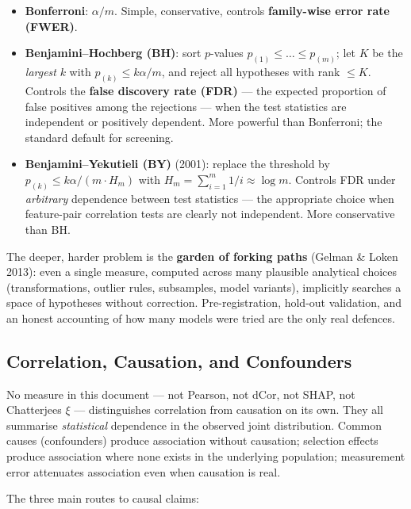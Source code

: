 \documentclass{article}
\providecommand{\tightlist}{\setlength{\itemsep}{0pt}\setlength{\parskip}{0pt}}
\begin{document}
\begin{itemize}
\tightlist
\item
  \textbf{Bonferroni}: \(\alpha / m\). Simple, conservative, controls
  \textbf{family-wise error rate (FWER)}.
\item
  \textbf{Benjamini--Hochberg (BH)}: sort \(p\)-values \(p_{(1)} \leq \dots \leq p_{(m)}\);
  let \(K\) be the \emph{largest} \(k\) with \(p_{(k)} \leq k\alpha/m\),
  and reject all hypotheses with rank \(\leq K\). Controls the
  \textbf{false discovery rate (FDR)} --- the expected proportion of
  false positives among the rejections --- when the test statistics
  are independent or positively dependent. More powerful than
  Bonferroni; the standard default for screening.
\item
  \textbf{Benjamini--Yekutieli (BY)} (2001): replace the threshold by
  \(p_{(k)} \leq k\alpha / (m \cdot H_m)\) with
  \(H_m = \sum_{i=1}^{m} 1/i \approx \log m\). Controls FDR under
  \emph{arbitrary} dependence between test statistics --- the
  appropriate choice when feature-pair correlation tests are clearly
  not independent. More conservative than BH.
\end{itemize}

The deeper, harder problem is the \textbf{garden of forking paths}
(Gelman \& Loken 2013): even a single measure, computed across many
plausible analytical choices (transformations, outlier rules,
subsamples, model variants), implicitly searches a space of hypotheses
without correction. Pre-registration, hold-out validation, and an honest
accounting of how many models were tried are the only real defences.

\subsection{Correlation, Causation, and
Confounders}\label{correlation-causation-and-confounders}

No measure in this document --- not Pearson, not dCor, not SHAP, not
Chatterjee\textquotesingle s \(\xi\) --- distinguishes correlation from
causation on its own. They all summarise \emph{statistical} dependence
in the observed joint distribution. Common causes (confounders) produce
association without causation; selection effects produce association
where none exists in the underlying population; measurement error
attenuates association even when causation is real.

The three main routes to causal claims:
\end{document}
